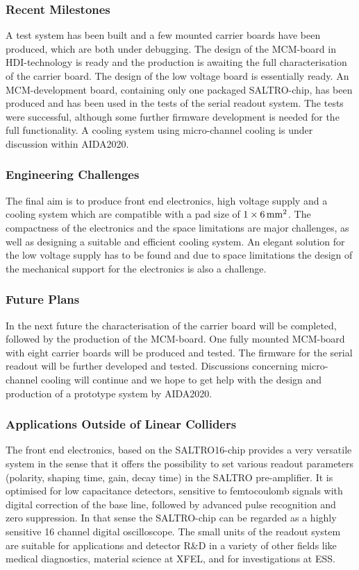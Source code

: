 \subsubsection{Recent Milestones}
A test system has been built and a few mounted carrier boards have been produced, which are both under debugging. The design of the MCM-board in HDI-technology is ready and the production is awaiting the full characterisation of the carrier board. The design of the low voltage board is essentially ready. An MCM-development board, containing only one packaged SALTRO-chip, has been produced and has been used in the tests of the serial readout system. The tests were successful, although some further firmware development is needed for the full functionality. A cooling system using micro-channel cooling is under discussion within AIDA2020.

\subsubsection{Engineering Challenges}
The final aim is to produce front end electronics, high voltage supply and a cooling system which are compatible with a pad size of $1 \times \unit[6]{mm^2}$. The compactness of the electronics and the space limitations are major challenges, as well as designing a suitable and efficient cooling system. An elegant solution for the low voltage supply has to be found and due to space limitations the design of the mechanical support for the electronics is also a challenge.

\subsubsection{Future Plans}
In the next future the characterisation of the carrier board will be completed, followed by the production of the MCM-board. One fully mounted MCM-board with eight carrier boards will be produced and tested. The firmware for the serial readout will be further developed and tested. Discussions concerning micro-channel cooling will continue and we hope to get help with the design and production of a prototype system by AIDA2020.

\subsubsection{Applications Outside of Linear Colliders}
The front end electronics, based on the SALTRO16-chip provides a very versatile system in the sense that it offers the possibility to set various readout parameters (polarity, shaping time, gain, decay time) in the SALTRO pre-amplifier. It is optimised for low capacitance detectors, sensitive to femtocoulomb signals with digital correction of the base line, followed by advanced pulse recognition and zero suppression.  In that sense the SALTRO-chip can be regarded as a highly sensitive 16 channel digital oscilloscope. The small units of the readout system are suitable for applications and detector R\&D in a variety of other fields like medical diagnostics, material science at XFEL, and for investigations at ESS.
